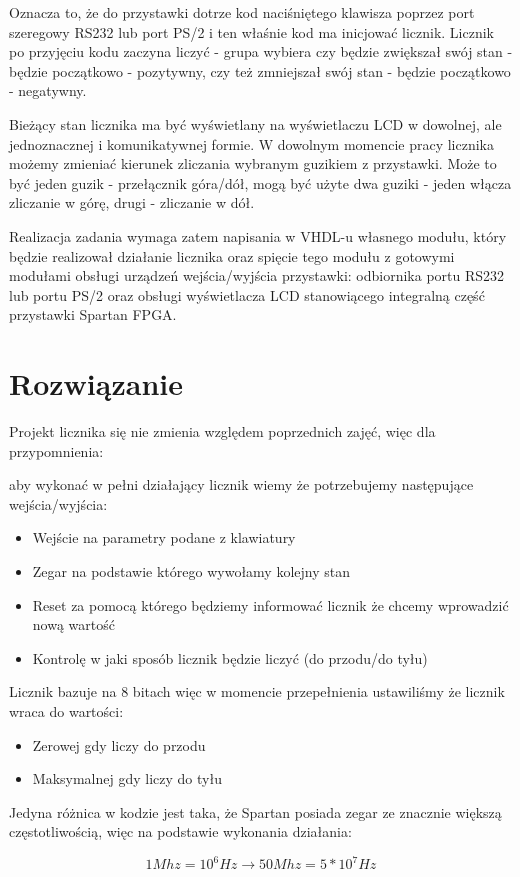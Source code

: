 \documentclass[a4paper,12pt]{extarticle}  %
\begin{document}
Oznacza to, że do przystawki dotrze kod naciśniętego klawisza poprzez port szeregowy RS232 lub port PS/2 i ten właśnie kod ma inicjować licznik. Licznik po przyjęciu kodu zaczyna liczyć - grupa wybiera czy będzie zwiększał swój stan - będzie początkowo - pozytywny, czy też zmniejszał swój stan - będzie początkowo - negatywny.

Bieżący stan licznika ma być wyświetlany na wyświetlaczu LCD w dowolnej, ale jednoznacznej i komunikatywnej formie. W dowolnym momencie pracy licznika możemy zmieniać kierunek zliczania wybranym guzikiem z przystawki. Może to być jeden guzik - przełącznik góra/dół, mogą być użyte dwa guziki - jeden włącza zliczanie w górę, drugi - zliczanie w dół.

Realizacja zadania wymaga zatem napisania w VHDL-u własnego modułu, który będzie realizował działanie licznika oraz spięcie tego modułu z gotowymi modułami obsługi urządzeń wejścia/wyjścia przystawki: odbiornika portu RS232 lub portu PS/2 oraz obsługi wyświetlacza LCD stanowiącego integralną część przystawki Spartan FPGA. 
\section{Rozwiązanie}
Projekt licznika się nie zmienia względem poprzednich zajęć, więc dla przypomnienia:

aby wykonać w pełni działający licznik wiemy że potrzebujemy następujące wejścia/wyjścia:
\begin{itemize}
	\item Wejście na parametry podane z klawiatury
	\item Zegar na podstawie którego wywołamy kolejny stan
	\item Reset za pomocą którego będziemy informować licznik że chcemy wprowadzić nową wartość
	\item Kontrolę w jaki sposób licznik będzie liczyć (do przodu/do tyłu)
\end{itemize}
Licznik bazuje na 8 bitach więc w momencie przepełnienia ustawiliśmy że licznik wraca do wartości:
\begin{itemize}
	\item Zerowej gdy liczy do przodu
	\item Maksymalnej gdy liczy do tyłu
\end{itemize}
Jedyna różnica w kodzie jest taka, że Spartan posiada zegar ze znacznie większą częstotliwością, więc na podstawie wykonania działania:

$$1Mhz = 10^6 Hz \rightarrow 50Mhz = 5*10^7Hz$$
\end{document}
